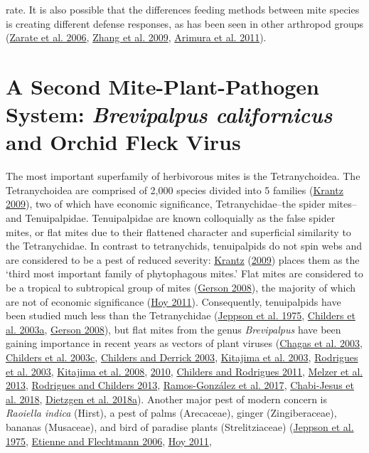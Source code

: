 \documentclass[12pt,final,CPage]{ufthesis}
\begin{document}
{rate. It is also possible that the differences feeding methods between mite species is creating different defense responses, as has been seen in other arthropod groups (\protect\hyperlink{ref-Zarate2006}{Zarate et al. 2006}, \protect\hyperlink{ref-Zhang2009}{Zhang et al. 2009}, \protect\hyperlink{ref-Arimura2011}{Arimura et al. 2011}).

  \hypertarget{litrev-brevi}{%
  \section{\texorpdfstring{A Second Mite-Plant-Pathogen System: \emph{Brevipalpus californicus} and Orchid Fleck Virus}{A Second Mite-Plant-Pathogen System: Brevipalpus californicus and Orchid Fleck Virus}}\label{litrev-brevi}}

  The most important superfamily of herbivorous mites is the Tetranychoidea. The Tetranychoidea are comprised of 2,000 species divided into 5 families (\protect\hyperlink{ref-Krantz2009}{Krantz 2009}), two of which have economic significance, Tetranychidae--the spider mites--and Tenuipalpidae. Tenuipalpidae are known colloquially as the false spider mites, or flat mites due to their flattened character and superficial similarity to the Tetranychidae. In contrast to tetranychids, tenuipalpids do not spin webs and are considered to be a pest of reduced severity: \protect\hyperlink{ref-Krantz2009}{Krantz} (\protect\hyperlink{ref-Krantz2009}{2009}) places them as the `third most important family of phytophagous mites.' Flat mites are considered to be a tropical to subtropical group of mites (\protect\hyperlink{ref-Gerson2008}{Gerson 2008}), the majority of which are not of economic significance (\protect\hyperlink{ref-Hoy2011}{Hoy 2011}). Consequently, tenuipalpids have been studied much less than the Tetranychidae (\protect\hyperlink{ref-Jeppson1975}{Jeppson et al. 1975}, \protect\hyperlink{ref-Childers2003b}{Childers et al. 2003a}, \protect\hyperlink{ref-Gerson2008}{Gerson 2008}), but flat mites from the genus \emph{Brevipalpus} have been gaining importance in recent years as vectors of plant viruses (\protect\hyperlink{ref-Chagas2003}{Chagas et al. 2003}, \protect\hyperlink{ref-Childers2003a}{Childers et al. 2003c}, \protect\hyperlink{ref-Childers2003c}{Childers and Derrick 2003}, \protect\hyperlink{ref-Kitajima2003b}{Kitajima et al. 2003}, \protect\hyperlink{ref-Rodrigues2003a}{Rodrigues et al. 2003}, \protect\hyperlink{ref-Kitajima2008}{Kitajima et al. 2008}, \protect\hyperlink{ref-Kitajima2010}{2010}, \protect\hyperlink{ref-Childers2011}{Childers and Rodrigues 2011}, \protect\hyperlink{ref-Melzer2013}{Melzer et al. 2013}, \protect\hyperlink{ref-Rodrigues2013}{Rodrigues and Childers 2013}, \protect\hyperlink{ref-RamosGonzalez2017}{Ramos-González et al. 2017}, \protect\hyperlink{ref-ChabiJesus2018}{Chabi-Jesus et al. 2018}, \protect\hyperlink{ref-Dietzgen2018}{Dietzgen et al. 2018a}). Another major pest of modern concern is \emph{Raoiella indica} (Hirst), a pest of palms (Arecaceae), ginger (Zingiberaceae), bananas (Musaceae), and bird of paradise plants (Strelitziaceae) (\protect\hyperlink{ref-Jeppson1975}{Jeppson et al. 1975}, \protect\hyperlink{ref-Etienne2006}{Etienne and Flechtmann 2006}, \protect\hyperlink{ref-Hoy2011}{Hoy 2011}, }
\end{document}

